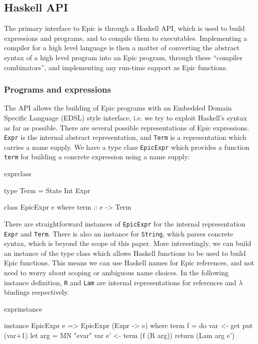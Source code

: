 \subsection{Haskell API}

The primary interface to Epic is through a Haskell API, which is used
to build expressions and programs, and to compile them to executables.
Implementing a compiler for a high level language is then a matter of
converting the abstract syntax of a high level program into an Epic
program, through these ``compiler combinators'', and implementing any
run-time support as Epic functions.

\subsubsection*{Programs and expressions}

The API allows the building of Epic programs with an Embedded Domain
Specific Language (EDSL) style interface, i.e. we try to exploit
Haskell's syntax as far as possible. There are several
possible representations of Epic expressions.
\texttt{Expr} is the internal abstract representation, and
\texttt{Term} is a representation which carries a name supply. We have
a type class \texttt{EpicExpr} which provides a function \texttt{term}
for building a concrete expression using a name supply:

\begin{SaveVerbatim}{exprclass}

type Term = State Int Expr

class EpicExpr e where
    term :: e -> Term

\end{SaveVerbatim}

There are straightforward instances of \texttt{EpicExpr} for the
internal representation \texttt{Expr} and \texttt{Term}. There is also
an instance for \texttt{String}, which parses concrete syntax, which
is beyond the scope of this paper. More interestingly, we can build an
instance of the type class which allows Haskell functions to be used
to build Epic functions.  This means we can use Haskell names for Epic
references, and not need to worry about scoping or ambiguous name
choices. In the following instance definition, \texttt{R} and
\texttt{Lam} are internal representations for references and $\lambda$
bindings respectively.

\begin{SaveVerbatim}{exprinstance}

instance EpicExpr e => EpicExpr (Expr -> e) where
    term f = do var <- get
                put (var+1)
                let arg = MN "evar" var
                e' <- term (f (R arg))
                return (Lam arg e')

\end{SaveVerbatim}

